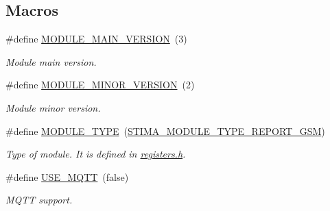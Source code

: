 \subsection*{Macros}
\begin{DoxyCompactItemize}
\item 
\mbox{\label{rmap-config_8h_a0d5c86ab9704d2fa4a6fe40bed8bfc59}} 
\#define \hyperlink{rmap-config_8h_a0d5c86ab9704d2fa4a6fe40bed8bfc59}{M\+O\+D\+U\+L\+E\+\_\+\+M\+A\+I\+N\+\_\+\+V\+E\+R\+S\+I\+ON}~(3)
\begin{DoxyCompactList}\small\item\em Module main version. \end{DoxyCompactList}\item 
\mbox{\label{rmap-config_8h_a2a4d13f49c683db07dcecd2379857d83}} 
\#define \hyperlink{rmap-config_8h_a2a4d13f49c683db07dcecd2379857d83}{M\+O\+D\+U\+L\+E\+\_\+\+M\+I\+N\+O\+R\+\_\+\+V\+E\+R\+S\+I\+ON}~(2)
\begin{DoxyCompactList}\small\item\em Module minor version. \end{DoxyCompactList}\item 
\mbox{\label{rmap-config_8h_a8c815d03b3fd3e18ca06f920a1eb4e8e}} 
\#define \hyperlink{rmap-config_8h_a8c815d03b3fd3e18ca06f920a1eb4e8e}{M\+O\+D\+U\+L\+E\+\_\+\+T\+Y\+PE}~(\hyperlink{stima__module_8h_aea131800c42cd2037b9a227f49d65872}{S\+T\+I\+M\+A\+\_\+\+M\+O\+D\+U\+L\+E\+\_\+\+T\+Y\+P\+E\+\_\+\+R\+E\+P\+O\+R\+T\+\_\+\+G\+SM})
\begin{DoxyCompactList}\small\item\em Type of module. It is defined in \hyperlink{registers_8h}{registers.\+h}. \end{DoxyCompactList}\item 
\mbox{\label{rmap-config_8h_a3c6bee2b593ec16dc4cf77ffcfd4cea8}} 
\#define \hyperlink{rmap-config_8h_a3c6bee2b593ec16dc4cf77ffcfd4cea8}{U\+S\+E\+\_\+\+M\+Q\+TT}~(false)
\begin{DoxyCompactList}\small\item\em M\+Q\+TT support. \end{DoxyCompactList}\item 
\mbox{\label{rmap-config_8h_ad1b880b20b32f399da65d86c5dd50cee}} 

\end{DoxyCompactItemize}
